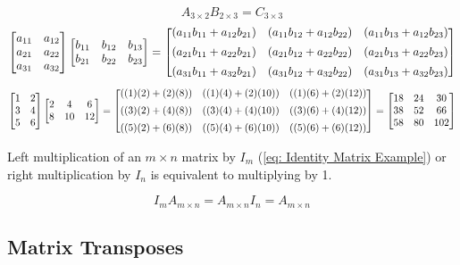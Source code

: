 \documentclass[main.tex]{subfiles}
\begin{document}
                    \begin{equation*}
                        A_{3 \times 2}B_{2 \times 3} = C_{3 \times 3}
                    \end{equation*}
                    \begin{equation*}
                        \begin{bmatrix} a_{11} & a_{12}\\a_{21} & a_{22}\\a_{31} & a_{32} \end{bmatrix}\begin{bmatrix} b_{11} & b_{12} & b_{13}\\b_{21} & b_{22} & b_{23} \end{bmatrix} = \begin{bmatrix} (a_{11}b_{11} + a_{12}b_{21}) & (a_{11}b_{12} + a_{12}b_{22}) & (a_{11}b_{13} + a_{12}b_{23})\\[0.5em] (a_{21}b_{11} + a_{22}b_{21}) & (a_{21}b_{12} + a_{22}b_{22}) & (a_{21}b_{13} + a_{22}b_{23}) \\[0.5em] (a_{31}b_{11} + a_{32}b_{21}) & (a_{31}b_{12} + a_{32}b_{22}) & (a_{31}b_{13} + a_{32}b_{23}) \end{bmatrix}
                    \end{equation*}
                    \begin{equation*}
                        \begin{bmatrix} 1 & 2\\3 & 4\\5 & 6 \end{bmatrix}\begin{bmatrix} 2 & 4 & 6\\8 & 10 & 12 \end{bmatrix} = \begin{bmatrix} ((1)(2) + (2)(8)) & ((1)(4) + (2)(10)) & ((1)(6) + (2)(12))\\[0.5em] ((3)(2) + (4)(8)) & ((3)(4) + (4)(10)) & ((3)(6) + (4)(12)) \\[0.5em] ((5)(2) + (6)(8)) & ((5)(4) + (6)(10)) & ((5)(6) + (6)(12)) \end{bmatrix} = \begin{bmatrix} 18 & 24 & 30\\ 38 & 52 & 66\\ 58 & 80 & 102 \end{bmatrix}
                    \end{equation*}

                    Left multiplication of an $m \times n$ matrix by $I_m$ (\eqref{eq: Identity Matrix Example}) or right multiplication by $I_n$ is equivalent to multiplying by 1.

                    \begin{equation}
                        I_m A_{m \times n} = A_{m \times n} I_n = A_{m \times n}
                    \end{equation}

                
                \newpage

                \subsection{Matrix Transposes}
                    
\end{document}

